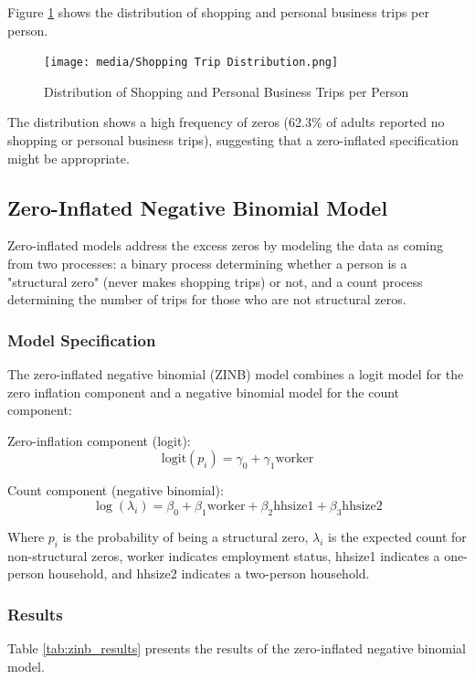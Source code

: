 \documentclass[12pt]{article}
\begin{document}
Figure \ref{fig:shopping_trips} shows the distribution of shopping and personal business trips per person.

\begin{figure}[H]
\centering
\texttt{[image: media/Shopping Trip Distribution.png]}
\caption{Distribution of Shopping and Personal Business Trips per Person}
\label{fig:shopping_trips}
\end{figure}

The distribution shows a high frequency of zeros (62.3\% of adults reported no shopping or personal business trips), suggesting that a zero-inflated specification might be appropriate.

\subsection{Zero-Inflated Negative Binomial Model}

Zero-inflated models address the excess zeros by modeling the data as coming from two processes: a binary process determining whether a person is a "structural zero" (never makes shopping trips) or not, and a count process determining the number of trips for those who are not structural zeros.

\subsubsection{Model Specification}

The zero-inflated negative binomial (ZINB) model combines a logit model for the zero inflation component and a negative binomial model for the count component:

Zero-inflation component (logit):
$$\text{logit}(p_i) = \gamma_0 + \gamma_1 \text{worker}$$

Count component (negative binomial):
$$\log(\lambda_i) = \beta_0 + \beta_1 \text{worker} + \beta_2 \text{hhsize1} + \beta_3 \text{hhsize2}$$

Where $p_i$ is the probability of being a structural zero, $\lambda_i$ is the expected count for non-structural zeros, worker indicates employment status, hhsize1 indicates a one-person household, and hhsize2 indicates a two-person household.

\subsubsection{Results}

Table \ref{tab:zinb_results} presents the results of the zero-inflated negative binomial model.
\end{document}
